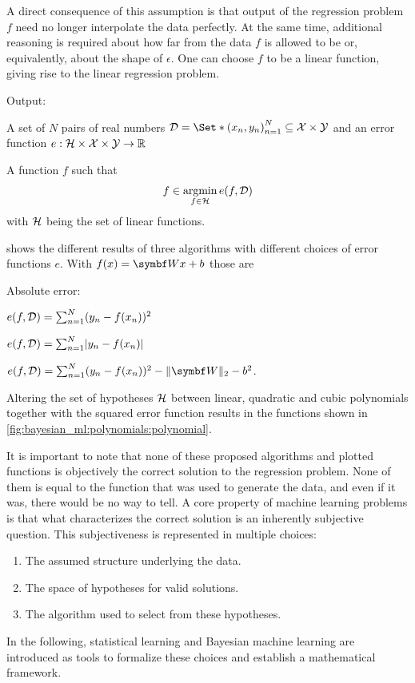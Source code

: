 A direct consequence of this assumption is that output of the regression problem $f$ need no longer interpolate the data perfectly.
At the same time, additional reasoning is required about how far from the data $f$ is allowed to be or, equivalently, about the shape of $\epsilon$.
One can choose $f$ to be a linear function, giving rise to the linear regression problem.
\begin{problem}
\begin{labeling}{Output:}
    \item[Input:] A set of $N$ pairs of real numbers $\Dc = \Set*{\left(x_n, y_n\right)}_{n=1}^N \subseteq \Xc \times \Yc$ and an error function $e : \mathcal{H} \times \mathcal{X} \times \mathcal{Y} \to \mathbb{R}$
    \item[Output:] A function $f$ such that
    \begin{align}
        f \in \operatorname*{argmin}_{f \in \mathcal{H}} e(f, \mathcal{D})
    \end{align}
    with $\mathcal{H}$ being the set of linear functions.
\end{labeling}
\end{problem}
 shows the different results of three algorithms with different choices of error functions $e$.
With $f(x) = \mat{W}x + b$ those are
\begin{labeling}{Absolute error:}
    \item[Squared error:] $e(f, \mathcal{D}) = \sum_{n=1}^N (y_n - f(x_n))^2$
    \item[Absolute error:] $e(f, \Dc) = \sum_{n=1}^N \abs{y_n - f(x_n)}$
    \item[Ridge:] $e(f, \Dc) = \sum_{n=1}^N (y_n - f(x_n))^2 - \norm{\mat{W}}_2 - b^2$.
\end{labeling}
Altering the set of hypotheses $\mathcal{H}$ between linear, quadratic and cubic polynomials together with the squared error function results in the functions shown in \cref{fig:bayesian_ml:polynomials:polynomial}.

It is important to note that none of these proposed algorithms and plotted functions is objectively the correct solution to the regression problem.
None of them is equal to the function that was used to generate the data, and even if it was, there would be no way to tell.
A core property of machine learning problems is that what characterizes the correct solution is an inherently subjective question.
This subjectiveness is represented in multiple choices:
\begin{enumerate}
    \item The assumed structure underlying the data.
    \item The space of hypotheses for valid solutions.
    \item The algorithm used to select from these hypotheses.
\end{enumerate}
In the following, statistical learning and Bayesian machine learning are introduced as tools to formalize these choices and establish a mathematical framework.

